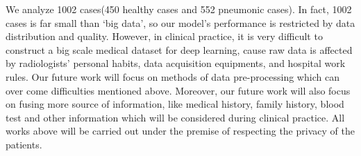 \documentclass[runningheads]{llncs}
\begin{document}
We analyze 1002 cases(450 healthy cases and 552 pneumonic cases). In fact, 1002 cases is far small than `big data', so our model's performance is restricted by data distribution and quality. However, in clinical practice, it is very difficult to construct a big scale medical dataset for deep learning, cause raw data is affected by radiologists' personal habits, data acquisition equipments, and hospital work rules. Our future work will focus on methods of data pre-processing which can over come difficulties mentioned above.
Moreover, our future work will also focus on fusing more source of information, like medical history, family history, blood test and other information which will be considered during clinical practice. All works above will be carried out under the premise of respecting the privacy of the patients.
 


  
\end{document}
